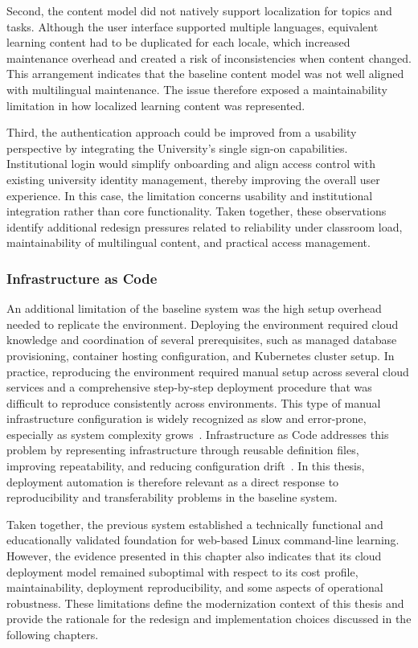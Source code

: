 Second, the content model did not natively support localization for topics and tasks.
Although the user interface supported multiple languages, equivalent learning content had to be duplicated for each locale, which increased maintenance overhead and created a risk of inconsistencies when content changed.
This arrangement indicates that the baseline content model was not well aligned with multilingual maintenance.
The issue therefore exposed a maintainability limitation in how localized learning content was represented.

Third, the authentication approach could be improved from a usability perspective by integrating the University's single sign-on capabilities.
Institutional login would simplify onboarding and align access control with existing university identity management, thereby improving the overall user experience.
In this case, the limitation concerns usability and institutional integration rather than core functionality.
Taken together, these observations identify additional redesign pressures related to reliability under classroom load, maintainability of multilingual content, and practical access management.

\subsubsection{Infrastructure as Code} \label{subsubsec:infrastructure-as-code}
An additional limitation of the baseline system was the high setup overhead needed to replicate the environment.
Deploying the environment required cloud knowledge and coordination of several prerequisites, such as managed database provisioning, container hosting configuration, and Kubernetes cluster setup.
In practice, reproducing the environment required manual setup across several cloud services and a comprehensive step-by-step deployment procedure that was difficult to reproduce consistently across environments.
This type of manual infrastructure configuration is widely recognized as slow and error-prone, especially as system complexity grows~\cite{guerriero_adoption_2019}.
Infrastructure as Code addresses this problem by representing infrastructure through reusable definition files, improving repeatability, and reducing configuration drift~\cite{guerriero_adoption_2019,bali_enhancing_2023}.
In this thesis, deployment automation is therefore relevant as a direct response to reproducibility and transferability problems in the baseline system.

Taken together, the previous system established a technically functional and educationally validated foundation for web-based Linux command-line learning.
However, the evidence presented in this chapter also indicates that its cloud deployment model remained suboptimal with respect to its cost profile, maintainability, deployment reproducibility, and some aspects of operational robustness.
These limitations define the modernization context of this thesis and provide the rationale for the redesign and implementation choices discussed in the following chapters.
